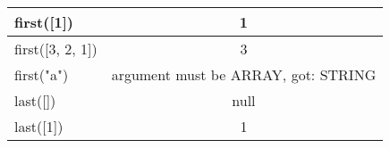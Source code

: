 \begin{table}[!ht]
\begin{threeparttable}
\begin{tabularx}{\textwidth}{|X|c|}
            \hline
            first({[}1{]})                                                   & 1                                          \\
            \hline
            first({[}3, 2, 1{]})                                             & 3                                          \\
            \hline
            first("a")                                                       & argument must be ARRAY, got: STRING        \\
            \hline
            last({[}{]})                                                     & null                                       \\
            \hline
            last({[}1{]})                                                    & 1                                          \\
            \hline
        \end{tabularx}
    \end{threeparttable}
    \vspace{\bottompaddingoftable}
\end{table}

\clearpage

